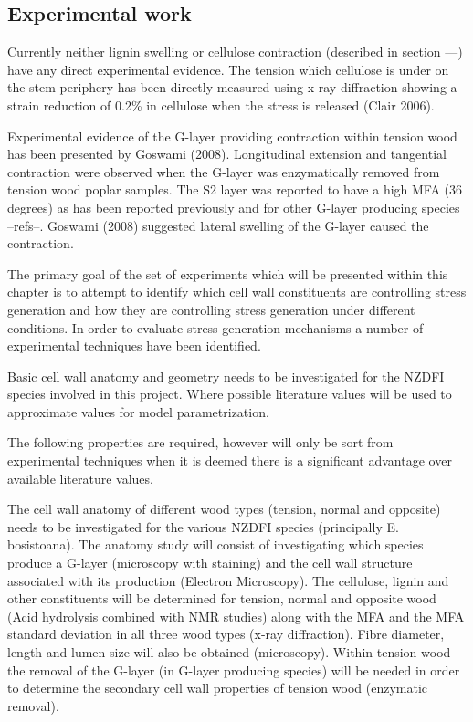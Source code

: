 \documentclass{article}
\begin{document}
\subsection{Experimental work}
Currently neither lignin swelling or cellulose contraction (described in section
---) have any direct experimental evidence. The tension which cellulose is under
on the stem periphery has been directly measured using x-ray diffraction showing
a strain reduction of 0.2\% in cellulose when the stress is released (Clair
2006).

Experimental evidence of the G-layer providing contraction within tension wood
has been presented by Goswami (2008). Longitudinal extension and tangential
contraction were observed when the G-layer was enzymatically removed from
tension wood poplar samples. The S2 layer was reported to have a high MFA (36
degrees) as has been reported previously and for other G-layer producing species
--refs--. Goswami (2008) suggested lateral swelling of the G-layer caused the
contraction.

The primary goal of the set of experiments which will be presented within this
chapter is to attempt to identify which cell wall constituents are controlling
stress generation and how they are controlling stress generation under different
conditions. In order to evaluate stress generation mechanisms a number of
experimental techniques have been identified.

Basic cell wall anatomy and geometry needs to be investigated for the NZDFI
species involved in this project. Where possible literature values will be used
to approximate values for model parametrization.

The following properties are required, however will only be sort from
experimental techniques when it is deemed there is a significant advantage over
available literature values.

The cell wall anatomy of different wood types (tension, normal and opposite)
needs to be investigated for the various NZDFI species (principally E.
bosistoana). The anatomy study will consist of investigating which species
produce a G-layer (microscopy with staining) and the cell wall structure
associated with its production (Electron Microscopy). The cellulose, lignin and
other constituents will be determined for tension, normal and opposite wood
(Acid hydrolysis combined with NMR studies) along with the MFA and the MFA
standard deviation in all three wood types (x-ray diffraction). Fibre diameter,
length and lumen size will also be obtained (microscopy). Within tension wood
the removal of the G-layer (in G-layer producing species) will be needed in
order to determine the secondary cell wall properties of tension wood (enzymatic
removal).
\end{document}
